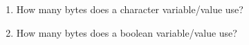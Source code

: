 
\begin{enumerate}

\item

  How many bytes does a character variable/value use?

\item

  How many bytes does a boolean variable/value use?

\end{enumerate}

